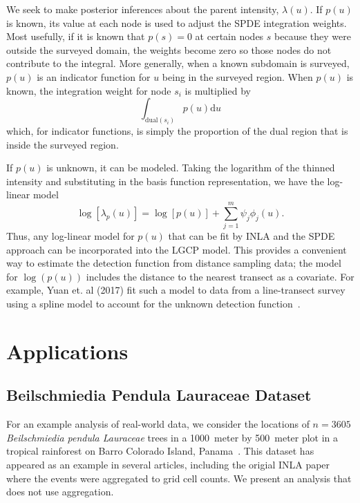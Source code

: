\documentclass[]{interact}
\begin{document}
We seek to make posterior inferences about the parent intensity,
\(\lambda(u)\). If \(p(u)\) is known, its value at each node is used to
adjust the SPDE integration weights. Most usefully, if it is known that
\(p(s) = 0\) at certain nodes \(s\) because they were outside the surveyed
domain, the weights become zero so those nodes do not contribute to the
integral. More generally, when a known subdomain is surveyed, \(p(u)\) is
an indicator function for \(u\) being in the surveyed region. When \(p(u)\)
is known, the integration weight for node \(s_{i}\) is multiplied by
\begin{displaymath}
\int_{\mathrm{dual}(s_{i})} p(u) \mathrm{d}u
\end{displaymath}
which, for indicator functions, is simply the proportion of the dual region
that is inside the surveyed region.

If \(p(u)\) is unknown, it can be modeled. Taking the logarithm of
the thinned intensity and substituting in the basis function representation,
we have the log-linear model
\begin{displaymath}
\log\left[\lambda_{p}(u)\right]
= \log\left[p(u)\right] + \sum_{j = 1}^{m} \psi_{j} \phi_{j}(u).
\end{displaymath}
Thus, any log-linear model for \(p(u)\) that can be fit by INLA and the SPDE
approach can be incorporated into the LGCP model. This provides a convenient
way to estimate the detection function from distance sampling data; the model
for \(\log(p(u))\) includes the distance to the nearest transect as a
covariate. For example, Yuan et. al (2017) fit such a model to data from a
line-transect survey using a spline model to account for the unknown detection
function~\cite{yuanetal}.


\section{Applications}
\label{application}


\subsection{Beilschmiedia Pendula Lauraceae Dataset}
\label{beianalysis}

For an example analysis of real-world data, we consider the locations of
\(n = 3605\) \emph{Beilschmiedia pendula Lauraceae} trees in a 1000~meter by
500~meter plot in a tropical rainforest on Barro Colorado Island,
Panama~\cite{moellerwaagepetersen}. This dataset has appeared as an example
in several articles, including the origial INLA paper where the events were
aggregated to grid cell counts. We present an analysis that does not use
aggregation.
\end{document}
